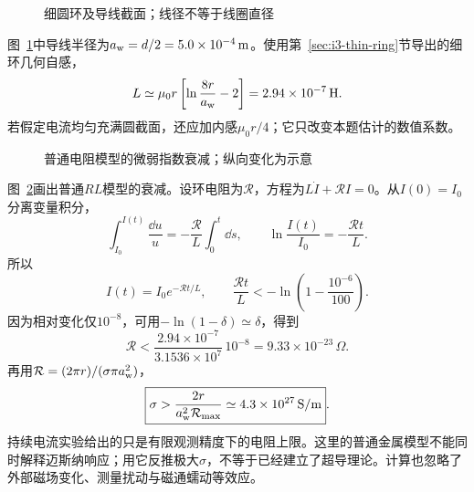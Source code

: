 \begin{figure}[H]\centering
{}
\caption{细圆环及导线截面；线径不等于线圈直径}\label{fig:i3-e8-q}
\end{figure}
\begin{solution}
图~\ref{fig:i3-e8-q}中导线半径为$a_{\rm w}=d/2=5.0\times10^{-4}\,\mathrm m$。使用第~\ref{sec:i3-thin-ring}节导出的细环几何自感，
\[
L\simeq\mu_0r\left[\ln\frac{8r}{a_{\rm w}}-2\right]
=2.94\times10^{-7}\,\mathrm H .
\]
若假定电流均匀充满圆截面，还应加内感$\mu_0r/4$；它只改变本题估计的数值系数。


\begin{figure}[H]\centering
{}
\caption{普通电阻模型的微弱指数衰减；纵向变化为示意}\label{fig:i3-e8-s}
\end{figure}

图~\ref{fig:i3-e8-s}画出普通$RL$模型的衰减。设环电阻为$\mathcal R$，方程为$L\dot I+\mathcal RI=0$。从$I(0)=I_0$分离变量积分，
\[\int_{I_0}^{I(t)}\frac{\dd u}u=-\frac{\mathcal R}{L}\int_0^t\dd s,
\qquad\ln\frac{I(t)}{I_0}=-\frac{\mathcal Rt}L.\]
所以
\[
I(t)=I_0e^{-\mathcal Rt/L},\qquad
\frac{\mathcal Rt}{L}<-\ln\left(1-\frac{10^{-6}}{100}\right).
\]
因为相对变化仅$10^{-8}$，可用$-\ln(1-\delta)\simeq\delta$，得到
\[
\mathcal R<\frac{2.94\times10^{-7}}{3.1536\times10^7}\,10^{-8}
=9.33\times10^{-23}\,\Omega.
\]
再用$\mathcal R=(2\pi r)/(\sigma\pi a_{\rm w}^2)$，
\[
\boxed{\sigma>\frac{2r}{a_{\rm w}^2\mathcal R_{\max}}
\simeq4.3\times10^{27}\,\mathrm{S/m}}.
\]
持续电流实验给出的只是有限观测精度下的电阻上限。这里的普通金属模型不能同时解释迈斯纳响应；用它反推极大$\sigma$，不等于已经建立了超导理论。计算也忽略了外部磁场变化、测量扰动与磁通蠕动等效应。
\end{solution}

